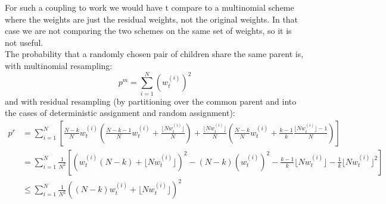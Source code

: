 \documentclass[fleqn]{article}
\newcommand{\wt}[2][t]{w_{#1}^{(#2)}}
\begin{document}
For such a coupling to work we would have t compare to a multinomial scheme where the weights are just the residual weights, not the original weights. In that case we are not comparing the two schemes on the same set of weights, so it is not useful.\\

\color{black}
The probability that a randomly chosen pair of children share the same parent is, with multinomial resampling:
\begin{equation*}
p^m = \sum_{i=1}^N (\wt{i})^2
\end{equation*}
and with residual resampling (by partitioning over the common parent and into the cases of deterministic assignment and random assignment):
\begin{align*}
p^r &= \sum_{i=1}^N  \left[ \frac{N-k}{N} \wt{i} \left( \frac{N-k-1}{N} \wt{i} + \frac{\lfloor N\wt{i}\rfloor}{N}\right) + \frac{\lfloor N\wt{i}\rfloor}{N} \left(\frac{N-k}{N} \wt{i} + \frac{k-1}{k} \frac{\lfloor N\wt{i}\rfloor -1}{N} \right) \right] \\
&= \sum_{i=1}^N \frac{1}{N^2} \left[ \left( \wt{i} (N-k) + \lfloor N\wt{i}\rfloor \right)^2 - (N-k) (\wt{i})^2 - \frac{k-1}{k} \lfloor N\wt{i}\rfloor - \frac{1}{k}  \lfloor N\wt{i}\rfloor^2 \right] \\
&\leq \sum_{i=1}^N \frac{1}{N^2} \left( (N-k) \wt{i} + \lfloor N\wt{i}\rfloor \right)^2
\end{align*}


\end{document}
